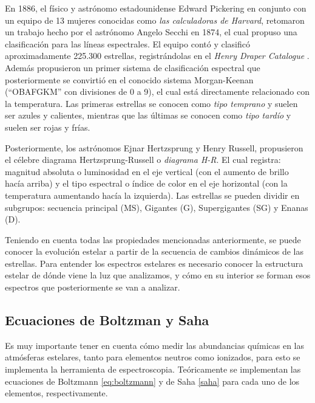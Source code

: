 \documentclass[12pt,oneside,openany,letter]{book}
\begin{document}
\noindent En 1886, el físico y astrónomo estadounidense Edward Pickering en conjunto con un equipo de 13 mujeres conocidas como \textit{las calculadoras de Harvard}, retomaron un trabajo hecho por el astrónomo Angelo Secchi en 1874, el cual propuso una clasificación para las líneas espectrales. El equipo contó y clasificó aproximadamente 225.300 estrellas, registrándolas en el \textit{Henry Draper Catalogue} \citep{gray2009stellar}. Además propusieron un primer sistema de clasificación espectral que posteriormente se convirtió en el conocido sistema Morgan-Keenan (``OBAFGKM'' con divisiones de 0 a 9), el cual está directamente relacionado con la temperatura. Las primeras estrellas se conocen como \textit{tipo temprano} y suelen ser azules y calientes, mientras que las últimas se conocen como \textit{tipo tardío} y suelen ser rojas y frías.
\vspace{2mm}

\noindent Posteriormente, los astrónomos Ejnar Hertzsprung y Henry Russell, propusieron el célebre diagrama Hertzsprung-Russell o \textit{diagrama H-R}. El cual registra: magnitud absoluta o luminosidad en el eje vertical (con el aumento de brillo hacía arriba) y el tipo espectral o índice de color en el eje horizontal (con la temperatura aumentando hacía la izquierda). Las estrellas se pueden dividir en subgrupos: secuencia principal (MS), Gigantes (G), Supergigantes (SG) y Enanas (D).

\noindent Teniendo en cuenta todas las propiedades mencionadas anteriormente, se puede conocer la evolución estelar a partir de la secuencia de cambios dinámicos de las estrellas. Para entender los espectros estelares es necesario conocer la estructura estelar de dónde viene la luz que analizamos, y cómo en su interior se forman esos espectros que posteriormente se van a analizar.


\subsection{Ecuaciones de Boltzman y Saha}

\noindent Es muy importante tener en cuenta cómo medir las abundancias químicas en las atmósferas estelares, tanto para elementos neutros como ionizados, para esto se implementa la herramienta de espectroscopia.  Teóricamente se implementan las ecuaciones de Boltzmann \ref{eq:boltzmann} y de Saha \ref{saha} para cada uno de los elementos, respectivamente. 
\vspace{2mm}
 
\end{document}
